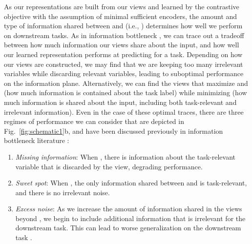 \documentclass{article}
\begin{document}
As our representations  are built from our views and learned by the contrastive objective with the assumption of minimal sufficient encoders, the amount and type of information shared between  and  (i.e., ) determines how well we perform on downstream tasks. As in information bottleneck \cite{tishby2000information}, we can trace out a tradeoff between how much information our views share about the input, and how well our learned representation performs at predicting  for a task. Depending on how our views are constructed, we may find that we are keeping too many irrelevant variables while discarding relevant variables,
leading to suboptimal performance on the information plane. Alternatively, we can find the views that maximize  and  (how much information is contained about the task label) while minimizing  (how much information is 
shared about the input, including both task-relevant and irrelevant information). Even in the case of these optimal traces, there are three regimes of performance we can consider that are depicted in Fig.~\ref{fig:schematic1}b, and have been discussed previously in information bottleneck literature \cite{tishby2000information,alemi2016deep,fischer2020conditional}:
\vspace{-3pt}
\begin{enumerate}[leftmargin=0.5cm]
    \item \emph{Missing information}: When , there is information about the task-relevant variable that is discarded by the view, degrading performance.
    \item \emph{Sweet spot}: When , the only information shared between  and  is task-relevant, and there is no irrelevant noise. 
    \item \emph{Excess noise}: As we increase the amount of information shared in the views beyond , we begin to include additional information that is irrelevant for the downstream task. This can lead to worse generalization on the downstream task \cite{alemi2016deep,shamir2010learning}.
\end{enumerate}
\vspace{-3pt}
\end{document}
